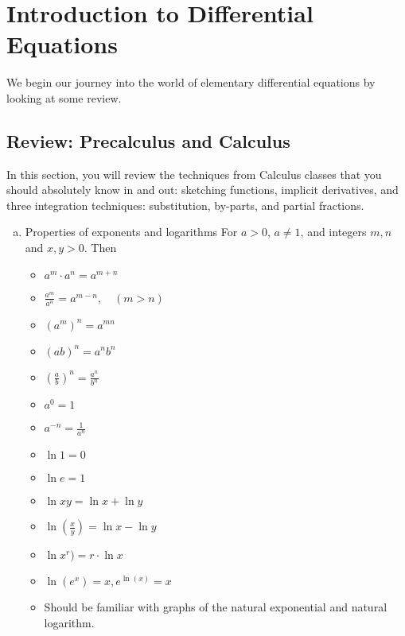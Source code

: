 \chapter{Introduction to Differential Equations}
\begin{fullwidth}
\begin{highlight}
We begin our journey into the world of elementary differential equations by looking at some review.


\section{Review: Precalculus and Calculus}
\begin{weekintro}
  In this section, you will review the techniques from Calculus classes that you should absolutely know in and out: sketching functions, implicit derivatives, and three integration techniques: substitution, by-parts, and partial fractions.    
\end{weekintro}

\begin{enumerate}[a)]
    \item Properties of exponents and logarithms
    For $a > 0$, $a \neq 1$, and integers $m, n$ and $x, y > 0$. Then
    \begin{multicols}{3}
    \begin{itemize}
        \item \(a^m \cdot a^n = a^{m+n}\)
        \item \(\frac{a^m}{a^n} = a^{m-n}, \quad (m > n)\)
        \item \((a^m)^n = a^{mn}\)
        \item \((ab)^n = a^n b^n\)
        \item \(\left(\frac{a}{b}\right)^n = \frac{a^n}{b^n}\)
        \item \(a^0 = 1\)
        \item \(a^{-n} = \frac{1}{a^n}\)
        \item \(\ln 1 = 0\)
        \item \(\ln e = 1\)
        \item \(\ln xy = \ln x + \ln y\)
        \item \(\ln \left(\frac{x}{y}\right) = \ln x - \ln y\)
        \item\(\ln x^r) = r \cdot \ln x\)
        \item $\ln(e^x) = x, e^{\ln(x)} = x$
        \item Should be familiar with graphs of the natural exponential and natural logarithm.
    \end{itemize}
    \end{multicols}


\end{enumerate}
\end{highlight}
\end{fullwidth}

